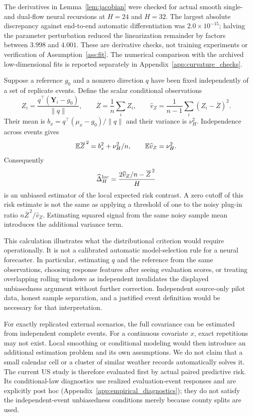 The derivatives in Lemma~\ref{lem:jacobian} were checked for actual smooth single- and dual-flow neural recursions at $H=24$ and $H=32$. The largest absolute discrepancy against end-to-end automatic differentiation was $2.0\times10^{-15}$; halving the parameter perturbation reduced the linearization remainder by factors between $3.998$ and $4.001$. These are derivative checks, not training experiments or verification of Assumption~\ref{ass:fit}. The numerical comparison with the archived low-dimensional fits is reported separately in Appendix~\ref{app:curvature_checks}.

Suppose a reference $g_0$ and a nonzero direction $q$ have been fixed independently of a set of replicate events. Define the scalar conditional observations
\[
 Z_i=\frac{q^\top(\mathbf Y_i-g_0)}{\|q\|},\qquad
 \overline Z=\frac1n\sum_i Z_i,
 \qquad \widehat v_Z=\frac1{n-1}\sum_i(Z_i-\overline Z)^2.
\]
Their mean is $b_x=q^\top(\mu_x-g_0)/\|q\|$ and their variance is $\nu_H^2$. Independence across events gives
\[
 \mathbb E\overline Z^{\,2}=b_x^2+\nu_H^2/n,
 \qquad \mathbb E\widehat v_Z=\nu_H^2.
\]
Consequently
\begin{equation}
 \widehat\Delta_H^{\rm loc}
 =\frac{2\widehat v_Z/n-\overline Z^{\,2}}{H}
 \label{eq:estimated_gap}
\end{equation}
is an unbiased estimator of the local expected risk contrast. A zero cutoff of this risk estimate is not the same as applying a threshold of one to the noisy plug-in ratio $n\overline Z^{\,2}/\widehat v_Z$. Estimating squared signal from the same noisy sample mean introduces the additional variance term.

This calculation illustrates what the distributional criterion would require operationally. It is not a calibrated automatic model-selection rule for a neural forecaster. In particular, estimating $q$ and the reference from the same observations, choosing response features after seeing evaluation scores, or treating overlapping rolling windows as independent invalidates the displayed unbiasedness argument without further correction. Independent source-only pilot data, honest sample separation, and a justified event definition would be necessary for that interpretation.

For exactly replicated external scenarios, the full covariance can be estimated from independent complete events. For a continuous covariate $x$, exact repetitions may not exist. Local smoothing or conditional modeling would then introduce an additional estimation problem and its own assumptions. We do not claim that a small calendar cell or a cluster of similar weather records automatically solves it. The current US study is therefore evaluated first by actual paired predictive risk. Its conditional-law diagnostics use realized evaluation-event responses and are explicitly post hoc (Appendix~\ref{app:empirical_diagnostics}); they do not satisfy the independent-event unbiasedness conditions merely because county splits are used.

